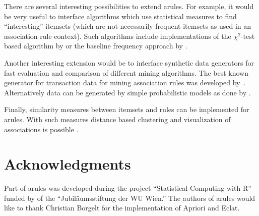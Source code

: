 \documentclass[10pt,a4paper]{article}
\newcommand{\strong}[1]{{\normalfont\fontseries{b}\selectfont #1}}
\newcommand{\pkg}[1]{\strong{#1}}
\begin{document}
There are several interesting possibilities to extend \pkg{arules}.  For
example, it would be very useful to interface algorithms which use
statistical measures to find ``interesting'' itemsets (which are not
necessarily frequent itemsets as used in an association rule context).
Such algorithms include implementations of the $\chi^2$-test based
algorithm by \cite{arules:Silverstein+Brin+Motwani:1998} or the baseline
frequency approach by \cite{arules:DuMouchel+Pregibon2001}.

Another interesting extension would be to interface synthetic data 
generators for fast evaluation and comparison of different mining algorithms.
The best known generator for
transaction data for mining association rules
was developed by~\cite{arules:Agrawal+Srikant:1994}.
Alternatively data can be generated by simple probabilistic models 
as done by
\cite{arules:Hahsler+Hornik+Reutterer:2005}.

Finally, similarity measures between itemsets and rules can be
implemented for \pkg{arules}. With such measures distance based
clustering and visualization of associations is possible 
\citep[see e.g.,][]{arules:Strehl+Gosh:2003}.

\section*{Acknowledgments}
Part of \pkg{arules} was developed  during the project 
``Statistical Computing with R'' funded by  of the
``Jubil\"aumsstiftung der WU Wien.''
The authors of \pkg{arules} would like to thank Christian Borgelt for the
implementation of Apriori and Eclat.




\end{document}
